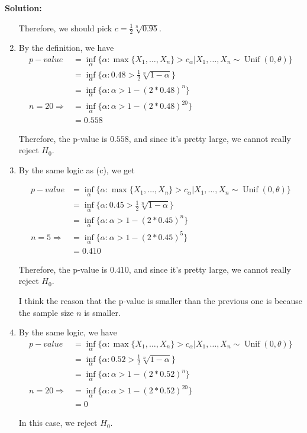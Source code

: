 \documentclass[13pt]{article}
\theoremstyle{definition}
\newenvironment{solution}
{\color{C2}\begin{framed}\begingroup\textbf{Solution:} }
  {\endgroup\end{framed}}
\theoremstyle{remark}
\begin{document}
\begin{solution}
\begin{enumerate}[label=(\alph*),topsep=0pt]
    Therefore, we should pick $c=\frac{1}{2}\sqrt[n]{0.95}$.
    \item By the definition, we have
    \begin{align*}
        p-value &= \inf_{\alpha}\{\alpha: \max\{X_1, \ldots, X_n\} > c_{\alpha} | X_1, \ldots, X_n \sim \operatorname{Unif}(0,\theta)\}\\
        &= \inf_{\alpha}\{\alpha: 0.48> \frac{1}{2}\sqrt[n]{1-\alpha}\}\\
        &= \inf_{\alpha}\{\alpha: \alpha> 1- (2*0.48)^n \}\\
        n=20 \Longrightarrow &= \inf_{\alpha}\{\alpha: \alpha> 1- (2*0.48)^{20} \}\\
        &=0.558
    \end{align*}
    
    Therefore, the p-value is $0.558$, and since it's pretty large, we cannot really reject $H_0$.
    \item By the same logic as (c), we get
    
    \begin{align*}
        p-value &= \inf_{\alpha}\{\alpha: \max\{X_1, \ldots, X_n\} > c_{\alpha} | X_1, \ldots, X_n \sim \operatorname{Unif}(0,\theta)\}\\
        &= \inf_{\alpha}\{\alpha: 0.45> \frac{1}{2}\sqrt[n]{1-\alpha}\}\\
        &= \inf_{\alpha}\{\alpha: \alpha> 1- (2*0.45)^n \}\\
        n=5 \Longrightarrow &= \inf_{\alpha}\{\alpha: \alpha> 1-(2*0.45)^{5} \}\\
        &=0.410
    \end{align*}
    
    Therefore, the p-value is $0.410$, and since it's pretty large, we cannot really reject $H_0$.
    
    I think the reason that the p-value is smaller than the previous one is because the sample size $n$ is smaller.
    \item By the same logic, we have
    \begin{align*}
        p-value &= \inf_{\alpha}\{\alpha: \max\{X_1, \ldots, X_n\} > c_{\alpha} | X_1, \ldots, X_n \sim \operatorname{Unif}(0,\theta)\}\\
        &= \inf_{\alpha}\{\alpha: 0.52> \frac{1}{2}\sqrt[n]{1-\alpha}\}\\
        &= \inf_{\alpha}\{\alpha: \alpha> 1- (2*0.52)^n \}\\
        n=20 \Longrightarrow &= \inf_{\alpha}\{\alpha: \alpha> 1-(2*0.52)^{20} \}\\
        &=0
    \end{align*}
    
    In this case, we reject $H_0$. 
    \end{enumerate}
\end{solution}
\end{document}
